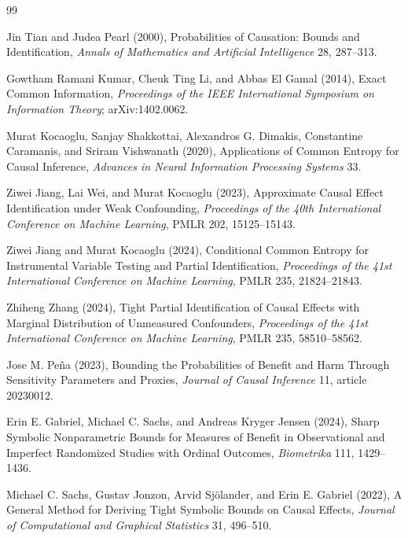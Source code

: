 \documentclass{article}
\begin{document}
\begin{thebibliography}{99}

   Jin Tian and Judea Pearl (2000), Probabilities of Causation: Bounds and Identification, \emph{Annals of Mathematics and Artificial Intelligence} 28, 287--313.

   Gowtham Ramani Kumar, Cheuk Ting Li, and Abbas El Gamal (2014), Exact Common Information, \emph{Proceedings of the IEEE International Symposium on Information Theory}; arXiv:1402.0062.

   Murat Kocaoglu, Sanjay Shakkottai, Alexandros G. Dimakis, Constantine Caramanis, and Sriram Vishwanath (2020), Applications of Common Entropy for Causal Inference, \emph{Advances in Neural Information Processing Systems} 33.

   Ziwei Jiang, Lai Wei, and Murat Kocaoglu (2023), Approximate Causal Effect Identification under Weak Confounding, \emph{Proceedings of the 40th International Conference on Machine Learning}, PMLR 202, 15125--15143.

   Ziwei Jiang and Murat Kocaoglu (2024), Conditional Common Entropy for Instrumental Variable Testing and Partial Identification, \emph{Proceedings of the 41st International Conference on Machine Learning}, PMLR 235, 21824--21843.

   Zhiheng Zhang (2024), Tight Partial Identification of Causal Effects with Marginal Distribution of Unmeasured Confounders, \emph{Proceedings of the 41st International Conference on Machine Learning}, PMLR 235, 58510--58562.

   Jose M. Peña (2023), Bounding the Probabilities of Benefit and Harm Through Sensitivity Parameters and Proxies, \emph{Journal of Causal Inference} 11, article 20230012.

   Erin E. Gabriel, Michael C. Sachs, and Andreas Kryger Jensen (2024), Sharp Symbolic Nonparametric Bounds for Measures of Benefit in Observational and Imperfect Randomized Studies with Ordinal Outcomes, \emph{Biometrika} 111, 1429--1436.

   Michael C. Sachs, Gustav Jonzon, Arvid Sjölander, and Erin E. Gabriel (2022), A General Method for Deriving Tight Symbolic Bounds on Causal Effects, \emph{Journal of Computational and Graphical Statistics} 31, 496--510.


\end{thebibliography}
\end{document}
